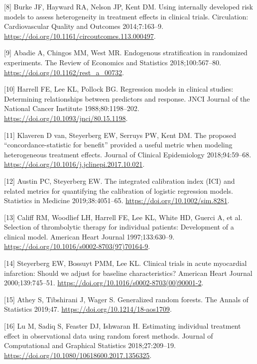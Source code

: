 \documentclass[]{elsarticle} %
\newenvironment{cslreferences}%
  {}%
  {\par}
\begin{document}
\begin{cslreferences}
\leavevmode\hypertarget{ref-Burke2014}{}%
{[}8{]} Burke JF, Hayward RA, Nelson JP, Kent DM. Using internally
developed risk models to assess heterogeneity in treatment effects in
clinical trials. Circulation: Cardiovascular Quality and Outcomes
2014;7:163--9. \url{https://doi.org/10.1161/circoutcomes.113.000497}.

\leavevmode\hypertarget{ref-Abadie2018}{}%
{[}9{]} Abadie A, Chingos MM, West MR. Endogenous stratification in
randomized experiments. The Review of Economics and Statistics
2018;100:567--80. \url{https://doi.org/10.1162/rest_a_00732}.

\leavevmode\hypertarget{ref-Harrell1988}{}%
{[}10{]} Harrell FE, Lee KL, Pollock BG. Regression models in clinical
studies: Determining relationships between predictors and response. JNCI
Journal of the National Cancer Institute 1988;80:1198--202.
\url{https://doi.org/10.1093/jnci/80.15.1198}.

\leavevmode\hypertarget{ref-vanKlaveren2018}{}%
{[}11{]} Klaveren D van, Steyerberg EW, Serruys PW, Kent DM. The
proposed ``concordance-statistic for benefit'' provided a useful metric
when modeling heterogeneous treatment effects. Journal of Clinical
Epidemiology 2018;94:59--68.
\url{https://doi.org/10.1016/j.jclinepi.2017.10.021}.

\leavevmode\hypertarget{ref-Austin2019}{}%
{[}12{]} Austin PC, Steyerberg EW. The integrated calibration index
(ICI) and related metrics for quantifying the calibration of logistic
regression models. Statistics in Medicine 2019;38:4051--65.
\url{https://doi.org/10.1002/sim.8281}.

\leavevmode\hypertarget{ref-Califf1997}{}%
{[}13{]} Califf RM, Woodlief LH, Harrell FE, Lee KL, White HD, Guerci A,
et al. Selection of thrombolytic therapy for individual patients:
Development of a clinical model. American Heart Journal 1997;133:630--9.
\url{https://doi.org/10.1016/s0002-8703(97)70164-9}.

\leavevmode\hypertarget{ref-Steyerberg2000}{}%
{[}14{]} Steyerberg EW, Bossuyt PMM, Lee KL. Clinical trials in acute
myocardial infarction: Should we adjust for baseline characteristics?
American Heart Journal 2000;139:745--51.
\url{https://doi.org/10.1016/s0002-8703(00)90001-2}.

\leavevmode\hypertarget{ref-Athey2019}{}%
{[}15{]} Athey S, Tibshirani J, Wager S. Generalized random forests. The
Annals of Statistics 2019;47. \url{https://doi.org/10.1214/18-aos1709}.

\leavevmode\hypertarget{ref-Lu2018}{}%
{[}16{]} Lu M, Sadiq S, Feaster DJ, Ishwaran H. Estimating individual
treatment effect in observational data using random forest methods.
Journal of Computational and Graphical Statistics 2018;27:209--19.
\url{https://doi.org/10.1080/10618600.2017.1356325}.


\end{cslreferences}
\end{document}
